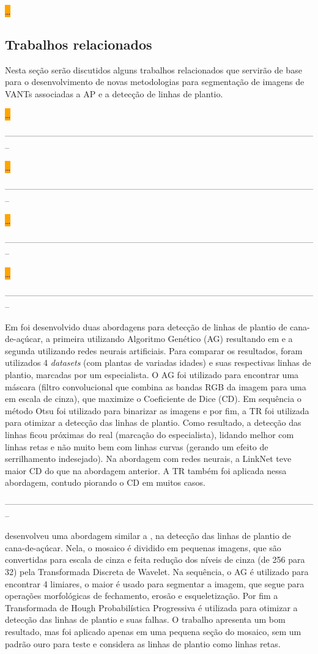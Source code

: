 \documentclass[12pt, a4paper, english, brazil]{article}
\newcommand{\dotsBlue}{\colorbox{orange}{\textcolor{blue}{\dots}}}
\newcommand{\linePage}{--------------------------------------------------------------------------------------------------------------}
\begin{document}
\dotsBlue

\subsection{Trabalhos relacionados}

Nesta seção serão discutidos alguns trabalhos relacionados que servirão de base para o desenvolvimento de novas metodologias para segmentação de imagens de VANTs associadas a AP e a detecção de linhas de plantio.

\cite{Souza_2017} \dotsBlue

\linePage

\cite{Souza_2018} \dotsBlue

\linePage

\cite{Rozo_2019} \dotsBlue

\linePage

\cite{Bah_2020} \dotsBlue

\linePage

Em  foi desenvolvido duas abordagens para detecção de linhas de plantio de cana-de-açúcar, a primeira utilizando Algoritmo Genético (AG) resultando em  e a segunda utilizando redes neurais artificiais. Para comparar os resultados, foram utilizados 4 \textit{datasets} (com plantas de variadas idades) e suas respectivas linhas de plantio, marcadas por um especialista. O AG foi utilizado para encontrar uma máscara (filtro convolucional que combina as bandas RGB da imagem para uma em escala de cinza), que maximize o Coeficiente de Dice (CD). Em sequência o método Otsu foi utilizado para binarizar as imagens e por fim, a TR foi utilizada para otimizar a detecção das linhas de plantio. Como resultado, a detecção das linhas ficou próximas do real (marcação do especialista), lidando melhor com linhas retas e não muito bem com linhas curvas (gerando um efeito de serrilhamento indesejado). Na abordagem com redes neurais, a LinkNet teve maior CD do que na abordagem anterior. A TR também foi aplicada nessa abordagem, contudo piorando o CD em muitos casos.

\linePage

 desenvolveu uma abordagem similar a , na detecção das linhas de plantio de cana-de-açúcar. Nela, o mosaico é dividido em pequenas imagens, que são convertidas para escala de cinza e feita redução dos níveis de cinza (de 256 para 32) pela Transformada Discreta de Wavelet. Na sequência, o AG é utilizado para encontrar 4 limiares, o maior é usado para segmentar a imagem, que segue para operações morfológicas de fechamento, erosão e esqueletização. Por fim a Transformada de Hough Probabilística Progressiva é utilizada para otimizar a detecção das linhas de plantio e suas falhas. O trabalho apresenta um bom resultado, mas foi aplicado apenas em uma pequena seção do mosaico, sem um padrão ouro para teste e considera as linhas de plantio como linhas retas.
\end{document}
